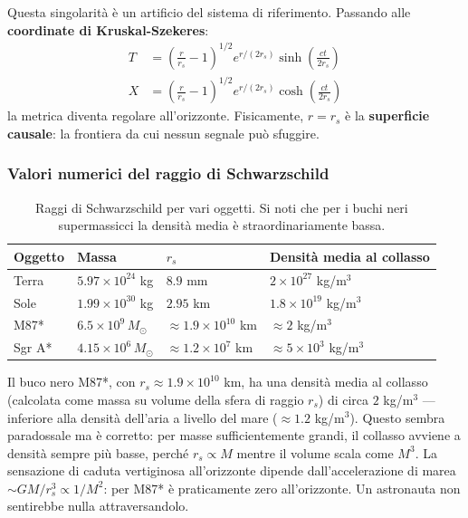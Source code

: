 \documentclass[12pt, a4paper, twoside]{article}
\newenvironment{curiosity}[1]{%
  \begin{tcolorbox}[curiositybox, title={Curiosit\`a: #1}]
}{%
  \end{tcolorbox}
}
\theoremstyle{definition}
\newcommand{\RS}{r_{\!s}}          %
\begin{document}
Questa singolarità è un artificio del sistema di riferimento. Passando alle
\textbf{coordinate di Kruskal-Szekeres}:
\begin{align}
  T &= \left(\frac{r}{\RS} - 1\right)^{1/2} e^{r/(2\RS)} \sinh\!\left(\frac{ct}{2\RS}\right)\\
  X &= \left(\frac{r}{\RS} - 1\right)^{1/2} e^{r/(2\RS)} \cosh\!\left(\frac{ct}{2\RS}\right)
\end{align}
la metrica diventa regolare all'orizzonte. Fisicamente, $r = \RS$ è la
\textbf{superficie causale}: la frontiera da cui nessun segnale può sfuggire.

\subsubsection{Valori numerici del raggio di Schwarzschild}

\begin{table}[h!]
  \centering
  \begin{tabular}{llll}
    \toprule
    \textbf{Oggetto} & \textbf{Massa} & $\RS$ & \textbf{Densità media al collasso}\\
    \midrule
    Terra    & $5.97\times10^{24}$ kg & $8.9$ mm & $2\times10^{27}$ kg/m$^3$ \\
    Sole     & $1.99\times10^{30}$ kg & $2.95$ km & $1.8\times10^{19}$ kg/m$^3$ \\
    M87*     & $6.5\times10^9\, M_\odot$ & $\approx 1.9\times10^{10}$ km & $\approx 2$ kg/m$^3$ \\
    Sgr A*   & $4.15\times10^6\, M_\odot$ & $\approx 1.2\times10^7$ km & $\approx 5\times10^3$ kg/m$^3$ \\
    \bottomrule
  \end{tabular}
  \caption{Raggi di Schwarzschild per vari oggetti. Si noti che per i buchi
           neri supermassicci la densità media è straordinariamente bassa.}
\end{table}

\begin{curiosity}{M87* ha densità inferiore all'aria!}
  Il buco nero M87*, con $\RS \approx 1.9 \times 10^{10}$ km, ha una densità
  media al collasso (calcolata come massa su volume della sfera di raggio $\RS$)
  di circa $2$ kg/m$^3$ — inferiore alla densità dell'aria a livello del mare
  ($\approx 1.2$ kg/m$^3$). Questo sembra paradossale ma è corretto: per
  masse sufficientemente grandi, il collasso avviene a densità sempre più
  basse, perché $\RS \propto M$ mentre il volume scala come $M^3$.
  La sensazione di caduta vertiginosa all'orizzonte dipende dall'accelerazione
  di marea $\sim GM/\RS^3 \propto 1/M^2$: per M87* è praticamente zero
  all'orizzonte. Un astronauta non sentirebbe nulla attraversandolo.
\end{curiosity}
\end{document}
